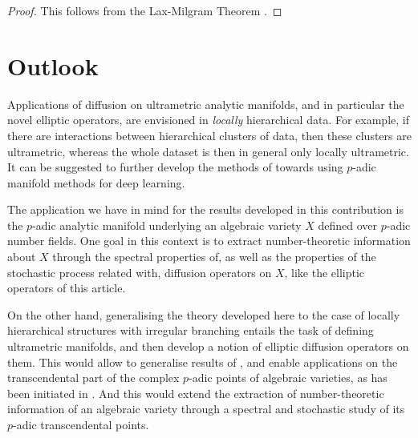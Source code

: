 \documentclass[a4paper,draft]{ZbRad}
\theoremstyle{plain}
\theoremstyle{definition}
\numberwithin{equation}{section}
\newcommand{\ToDo}[1]{{{\bigskip\noindent\bf To Do: }#1\medskip}}
\begin{document}
\begin{proof}
This follows from the Lax-Milgram Theorem 
\cite[Corollary 5.8]{Brezis2010}.
\end{proof}
\section{Outlook}


Applications of diffusion on ultrametric
analytic manifolds, and in particular the novel elliptic operators, are envisioned in \emph{locally} hierarchical data. For example, if there are interactions between hierarchical clusters of data, then these clusters are ultrametric, whereas the whole dataset is then in general only locally ultrametric. It can be suggested to further develop the methods of 
\cite{AngelDiss} towards using $p$-adic manifold methods for deep learning.
\newline

The application we have in mind for the results developed in this contribution is the $p$-adic analytic manifold underlying an algebraic variety $X$ defined over $p$-adic number fields. One goal in this context is to extract number-theoretic information about $X$ through the spectral properties of, as well as the properties of the stochastic process related with, diffusion operators on $X$, like the elliptic operators of this article. 
\newline

On the other hand, generalising the theory developed here to the case of locally hierarchical structures with irregular branching entails the task of defining ultrametric manifolds, and then develop a notion of elliptic diffusion operators on them. This would allow to generalise results of \cite{VPZeta}, and enable applications on the transcendental part of the complex $p$-adic points of algebraic varieties, as has been initiated in \cite{SchottkyTrans,HalwasBA}.
And this would extend the extraction of number-theoretic information of an algebraic variety through a spectral and stochastic study of its $p$-adic transcendental points.
\end{document}
